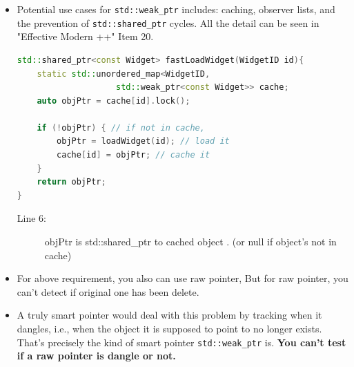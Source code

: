 \documentclass[a4paper,11pt,twoside]{book}
\begin{document}
\begin{itemize}
\item Potential use cases for \texttt{std::weak\_ptr} includes: caching, observer lists, and the prevention of \texttt{std::shared\_ptr} cycles.  All the detail can be seen in "Effective Modern ++" Item 20.
\begin{lstlisting}[frame=single, language=c++]
std::shared_ptr<const Widget> fastLoadWidget(WidgetID id){
	static std::unordered_map<WidgetID, 
	                std::weak_ptr<const Widget>> cache;
	auto objPtr = cache[id].lock();

	if (!objPtr) { // if not in cache,
		objPtr = loadWidget(id); // load it
		cache[id] = objPtr; // cache it
	}
	return objPtr;
}
\end{lstlisting}
\begin{description}
	\item[Line 6:] objPtr is std::shared\_ptr to cached object . (or null if object's not in cache)
\end{description}


\item For above requirement, you also can use raw pointer, But for raw pointer, you can't detect if original one has been delete. 

    \item A truly smart pointer would deal with this problem by tracking when it dangles, i.e., when the object it is supposed to point to no longer exists. That's precisely the kind of smart pointer \texttt{std::weak\_ptr} is. \textbf{You can't test if a raw pointer is dangle or not.}
        

\end{itemize}
\end{document}
